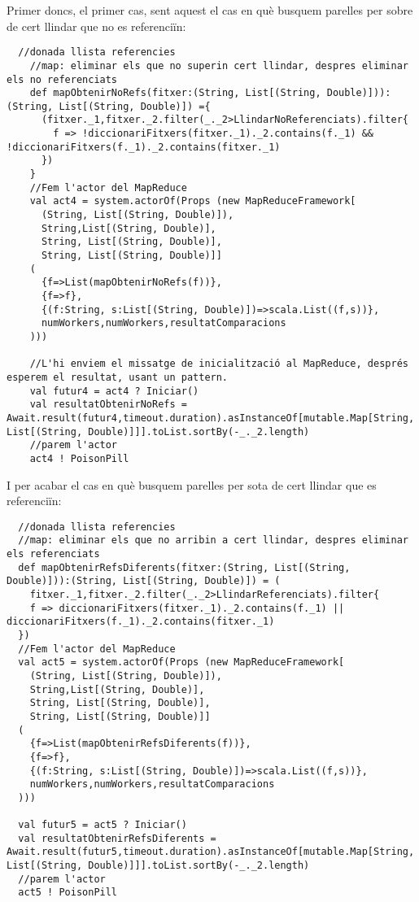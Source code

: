 \documentclass[11pt,a4paper,twoside]{report}
\begin{document}
Primer doncs, el primer cas, sent aquest el cas en què busquem parelles per sobre de cert llindar que no es referenciïn:
\begin{lstlisting}
  //donada llista referencies
    //map: eliminar els que no superin cert llindar, despres eliminar els no referenciats
    def mapObtenirNoRefs(fitxer:(String, List[(String, Double)])):(String, List[(String, Double)]) ={
      (fitxer._1,fitxer._2.filter(_._2>LlindarNoReferenciats).filter{
        f => !diccionariFitxers(fitxer._1)._2.contains(f._1) && !diccionariFitxers(f._1)._2.contains(fitxer._1)
      })
    }
    //Fem l'actor del MapReduce
    val act4 = system.actorOf(Props (new MapReduceFramework[
      (String, List[(String, Double)]),
      String,List[(String, Double)],
      String, List[(String, Double)],
      String, List[(String, Double)]]
    (
      {f=>List(mapObtenirNoRefs(f))},
      {f=>f},
      {(f:String, s:List[(String, Double)])=>scala.List((f,s))},
      numWorkers,numWorkers,resultatComparacions
    )))

    //L'hi enviem el missatge de inicialització al MapReduce, després esperem el resultat, usant un pattern.
    val futur4 = act4 ? Iniciar()
    val resultatObtenirNoRefs = Await.result(futur4,timeout.duration).asInstanceOf[mutable.Map[String, List[(String, Double)]]].toList.sortBy(-_._2.length)
    //parem l'actor
    act4 ! PoisonPill
\end{lstlisting}

I per acabar el cas en què busquem parelles per sota de cert llindar que es referenciïn:

\begin{lstlisting}
  //donada llista referencies
  //map: eliminar els que no arribin a cert llindar, despres eliminar els referenciats
  def mapObtenirRefsDiferents(fitxer:(String, List[(String, Double)])):(String, List[(String, Double)]) = (
    fitxer._1,fitxer._2.filter(_._2>LlindarReferenciats).filter{
    f => diccionariFitxers(fitxer._1)._2.contains(f._1) || diccionariFitxers(f._1)._2.contains(fitxer._1)
  })
  //Fem l'actor del MapReduce
  val act5 = system.actorOf(Props (new MapReduceFramework[
    (String, List[(String, Double)]),
    String,List[(String, Double)],
    String, List[(String, Double)],
    String, List[(String, Double)]]
  (
    {f=>List(mapObtenirRefsDiferents(f))},
    {f=>f},
    {(f:String, s:List[(String, Double)])=>scala.List((f,s))},
    numWorkers,numWorkers,resultatComparacions
  )))

  val futur5 = act5 ? Iniciar()
  val resultatObtenirRefsDiferents = Await.result(futur5,timeout.duration).asInstanceOf[mutable.Map[String, List[(String, Double)]]].toList.sortBy(-_._2.length)
  //parem l'actor
  act5 ! PoisonPill
\end{lstlisting}
\end{document}
